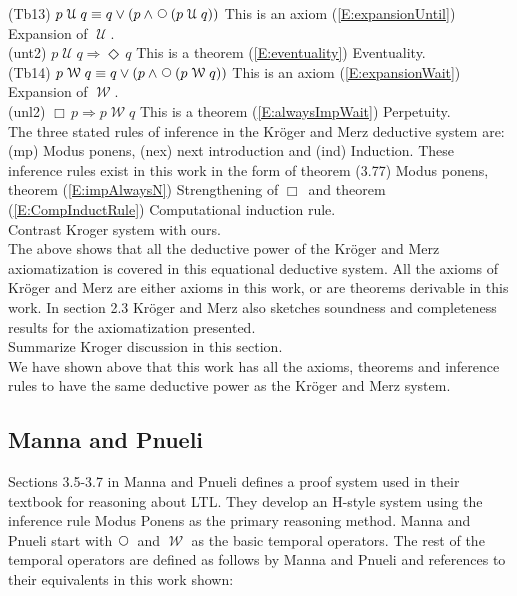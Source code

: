 \documentclass[12pt, fleqn, leqno]{article}
\newcommand{\impl}{\ensuremath{\Rightarrow}}        %
\newcommand{\Until}{\;\mathcal{U}\;}
\newcommand{\Wait}{\;\mathcal{W}\;}
\newcommand{\Next}{\;\,\text{\raisebox{3.5pt}{\circle{6}}}}
\newcommand{\Event}{\Diamond\,}
\newcommand{\Always}{\Box\,}
\begin{document}
(Tb13) $p \Until q \equiv q \lor (p \land \Next (p \Until q))$ This is an axiom (\ref{E:expansionUntil}) Expansion of $\Until$.\\

(unt2) $p \Until q \impl \Event q$ This is a theorem (\ref{E:eventuality}) Eventuality.\\

(Tb14) $p \Wait q \equiv q \lor (p \land \Next (p \Wait q))$ This is an axiom (\ref{E:expansionWait}) Expansion of $\Wait$.\\

(unl2) $\Always p \impl p \Wait q$ This is a theorem (\ref{E:alwaysImpWait}) Perpetuity.\\

The three stated rules of inference in the Kröger and Merz deductive system are: (mp) Modus ponens,
(nex) next introduction and (ind) Induction.
These inference rules exist in this work in the form of  
theorem (3.77) Modus ponens,  theorem (\ref{E:impAlwaysN}) Strengthening of $\Always$
and theorem (\ref{E:CompInductRule}) Computational induction rule.\\

Contrast Kroger system with ours.\\

The above shows that all the deductive power of the Kröger and Merz axiomatization is covered
in this equational deductive system. All the axioms of Kröger and Merz are either axioms
in this work, or are theorems derivable in this work. In section 2.3 Kröger and Merz also
sketches soundness and completeness results for the axiomatization presented.\\

Summarize Kroger discussion in this section.\\

We have shown above that this work has all the axioms, 
theorems and inference rules to have the same deductive power as the Kröger and Merz system.\\


\subsection{Manna and Pnueli}

Sections 3.5-3.7 in Manna and Pnueli \cite{Manna} defines a proof system used in their textbook for reasoning about LTL.
They develop an H-style system using the inference rule Modus Ponens as the primary reasoning method.
Manna and Pnueli start with $\Next$ and $\Wait$ as the basic temporal operators. The rest of the temporal operators
are defined as follows by Manna and Pnueli and references to their equivalents in this work shown:\\
\end{document}

